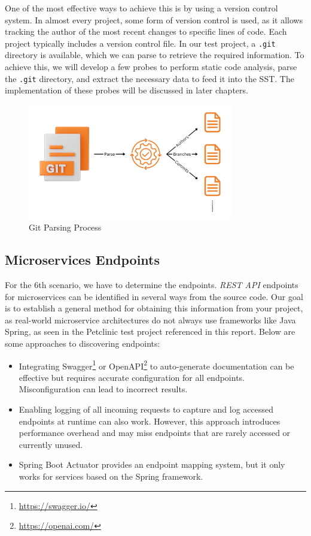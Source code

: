 One of the most effective ways to achieve this is by using a version control system. In almost every project, some form of version control is used, as it allows tracking the author of the most recent changes to specific lines of code. Each project typically includes a version control file. In our test project, a \texttt{.git} directory is available, which we can parse to retrieve the required information. To achieve this, we will develop a few probes to perform static code analysis, parse the \texttt{.git} directory, and extract the necessary data to feed it into the SST. The implementation of these probes will be discussed in later chapters.

\begin{figure}[H]
    \centering
    \includegraphics[width=0.8\textwidth]{figures/parse_git_file.png}
    \caption{Git Parsing Process}
    \label{fig_parse_git_file}
\end{figure}
 
\subsection{Microservices Endpoints}

For the 6th scenario, we have to determine the endpoints. \textit{REST API} endpoints for microservices can be identified in several ways from the source code. Our goal is to establish a general method for obtaining this information from your project, as real-world microservice architectures do not always use frameworks like Java Spring, as seen in the Petclinic test project referenced in this report. Below are some approaches to discovering endpoints:

\begin{itemize}
    \item Integrating Swagger\footnote{\url{https://swagger.io/}} or OpenAPI\footnote{\url{https://openai.com/}} to auto-generate documentation can be effective but requires accurate configuration for all endpoints. Misconfiguration can lead to incorrect results.
    \item Enabling logging of all incoming requests to capture and log accessed endpoints at runtime can also work. However, this approach introduces performance overhead and may miss endpoints that are rarely accessed or currently unused.
    \item Spring Boot Actuator provides an endpoint mapping system, but it only works for services based on the Spring framework.
\end{itemize}

